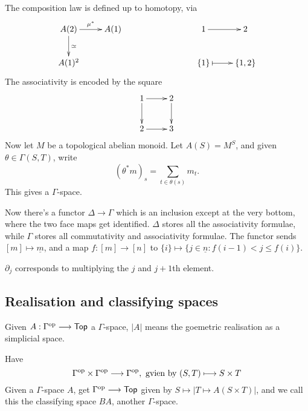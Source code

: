 \documentclass[11pt]{article}
\begin{document}
\begin{JandrGammaSpaces}
The composition law is defined up to homotopy, via
\[\xymatrix{
\ar[d]^{\simeq} A(2)\ar[r]^{\mu^*}& A(1)& & & 1\ar[r]& 2\\
 A(1)^2& &&& \{1\}\ar@{|->}[r]& \{1,2\}\\
}\]
The associativity is encoded by the square
\[\xymatrix{
 1\ar[d]\ar[r]&2\ar[d]\\
 2\ar[r]& 3
}\]
Now let $M$ be a topological abelian monoid. Let $A(S)=M^S$, and given $\theta\in\Gamma(S,T)$, write
\[(\theta^*m)_s=\sum_{t\in \theta(s)}m_t.\]
This gives a $\Gamma$-space.

Now there's a functor $\Delta\to\Gamma$ which is an inclusion except at the  very bottom, where the two face maps get identified. $\Delta$ stores all the associativity formulae, while $\Gamma$ stores all commutativity and associativity formulae. The functor sends
$[m]\mapsto \underline{m}$, and a map $f:[m]\to[n]$ to $\{i\}\mapsto \{j\in\underline{n}:f(i-1)<j\leq f(i)\}$.

$\partial_j$ corresponds to multiplying the $j$ and $j+1$th element.
\subsection*{Realisation and classifying spaces}
Given $A:\Gamma^{\textup{op}}\longrightarrow\operatorname{{\mathsf{Top}}}$ a $\Gamma$-space, $|A|$ means the goemetric realisation as a simplicial space.

Have
\[\Gamma^{\textup{op}}\times\Gamma^{\textup{op}}\longrightarrow\Gamma^{\textup{op}},\text{ gvien by }(S,T)\longmapsto S\times T\]
Given a $\Gamma$-space $A$, get $\Gamma^{\textup{op}}\longrightarrow\operatorname{{\mathsf{Top}}}$ given by $S \mapsto |T\mapsto A(S\times T)|$, and we call this the classifying space $BA$, another $\Gamma$-space.


\end{JandrGammaSpaces}
\end{document}
